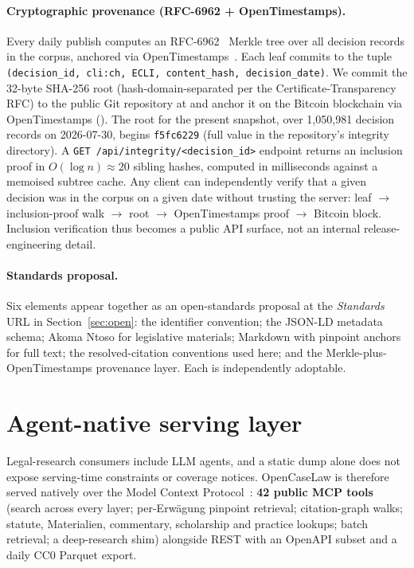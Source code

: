 \documentclass[11pt,a4paper]{article}
\begin{document}
\paragraph{Cryptographic provenance (RFC-6962 + OpenTimestamps).} Every daily publish computes an RFC-6962~\citep{rfc6962} Merkle tree over all decision records in the corpus, anchored via OpenTimestamps~\citep{opentimestamps}. Each leaf commits to the tuple \texttt{(decision\_id, cli:ch, ECLI, content\_hash, decision\_date)}. We commit the 32-byte SHA-256 root (hash-domain-separated per the Certificate-Transparency RFC) to the public Git repository at  and anchor it on the Bitcoin blockchain via OpenTimestamps (). The root for the present snapshot, over 1{,}050{,}981 decision records on 2026-07-30, begins \texttt{f5fc6229} (full value in the repository's integrity directory). A \texttt{GET /api/integrity/<decision\_id>} endpoint returns an inclusion proof in $O(\log n) \approx 20$ sibling hashes, computed in milliseconds against a memoised subtree cache. Any client can independently verify that a given decision was in the corpus on a given date without trusting the server: leaf $\to$ inclusion-proof walk $\to$ root $\to$ OpenTimestamps proof $\to$ Bitcoin block. Inclusion verification thus becomes a public API surface, not an internal release-engineering detail.

\paragraph{Standards proposal.} Six elements appear together as an open-standards proposal at the \emph{Standards} URL in Section~\ref{sec:open}: the identifier convention; the JSON-LD metadata schema; Akoma Ntoso for legislative materials; Markdown with pinpoint anchors for full text; the resolved-citation conventions used here; and the Merkle-plus-OpenTimestamps provenance layer. Each is independently adoptable.

\section{Agent-native serving layer}\label{sec:serving}

Legal-research consumers include LLM agents, and a static dump alone does not expose serving-time constraints or coverage notices. OpenCaseLaw is therefore served natively over the Model Context Protocol~\citep{mcpspec2025}: \textbf{42 public MCP tools} (search across every layer; per-Erwägung pinpoint retrieval; citation-graph walks; statute, Materialien, commentary, scholarship and practice lookups; batch retrieval; a deep-research shim) alongside REST with an OpenAPI subset and a daily CC0 Parquet export.
\end{document}
